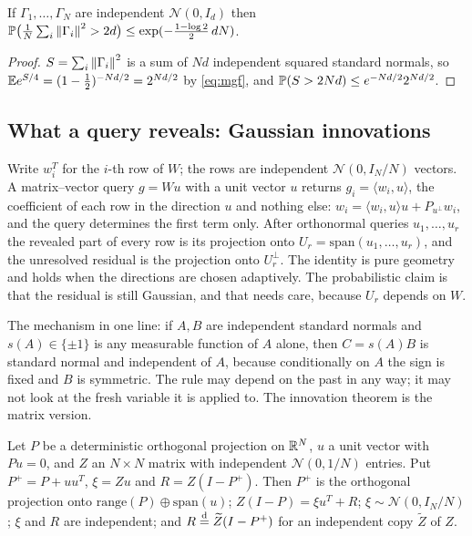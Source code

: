 \begin{lemma}\label{lem:chisq}
If $\Gamma_1,\dots,\Gamma_N$ are independent $\mathcal N(0,I_d)$ then $\mathbb{P}\bigl(\frac1N\sum_i\left\lVert \Gamma_i\right\rVert^2>2d\bigr)\le\exp(-\tfrac{1-\log2}2\,dN)$.
\end{lemma}

\begin{proof}
$S=\sum_i\left\lVert \Gamma_i\right\rVert^2$ is a sum of $Nd$ independent squared standard normals, so $\mathbb{E} e^{S/4}=(1-\tfrac12)^{-Nd/2}=2^{Nd/2}$ by \cref{eq:mgf}, and $\mathbb{P}(S>2Nd)\le e^{-Nd/2}2^{Nd/2}$.
\end{proof}

\subsection{What a query reveals: Gaussian innovations}

Write $w_i^T$ for the $i$-th row of $W$; the rows are independent $\mathcal N(0,I_N/N)$ vectors. A matrix--vector query $g=Wu$ with a unit vector $u$ returns $g_i=\langle w_i,u\rangle$, the coefficient of each row in the direction $u$ and nothing else: $w_i=\langle w_i,u\rangle u+P_{u^\perp}w_i$, and the query determines the first term only. After orthonormal queries $u_1,\dots,u_r$ the revealed part of every row is its projection onto $U_r=\mathrm{span}(u_1,\dots,u_r)$, and the unresolved residual is the projection onto $U_r^\perp$. The identity is pure geometry and holds when the directions are chosen adaptively. The probabilistic claim is that the residual is still Gaussian, and that needs care, because $U_r$ depends on $W$.

The mechanism in one line: if $A,B$ are independent standard normals and $s(A)\in\{\pm1\}$ is any measurable function of $A$ alone, then $C=s(A)B$ is standard normal and independent of $A$, because conditionally on $A$ the sign is fixed and $B$ is symmetric. The rule may depend on the past in any way; it may not look at the fresh variable it is applied to. The innovation theorem is the matrix version.

\begin{lemma}\label{lem:decomp}
Let $P$ be a deterministic orthogonal projection on $\mathbb{R}^N$, $u$ a unit vector with $Pu=0$, and $Z$ an $N\times N$ matrix with independent $\mathcal N(0,1/N)$ entries. Put $P^+=P+uu^T$, $\xi=Zu$ and $R=Z(I-P^+)$. Then $P^+$ is the orthogonal projection onto $\mathrm{range}(P)\oplus\mathrm{span}(u)$; $Z(I-P)=\xi u^T+R$; $\xi\sim\mathcal N(0,I_N/N)$; $\xi$ and $R$ are independent; and $R\overset{\mathrm{d}}{=}\widetilde Z(I-P^+)$ for an independent copy $\widetilde Z$ of $Z$.
\end{lemma}

